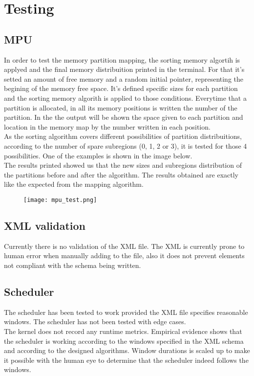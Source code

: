 \chapter{Testing}

\section{MPU}
In order to test the memory partition mapping, the sorting memory algortih is applyed and the final memory distribuition printed in the terminal. For 
that it's setted an amount of free memory and a random initial pointer, representing the begining of the memory free 
space. It's defined specific sizes for each partition and the sorting memory algorith is applied to those 
conditions. Everytime that a partition is allocated, in all its memory positions is written the number of 
the partition. In the the output will be shown the space given to each partition and location in the 
memory map by the number written in each position.\\
As the sorting algorithm covers different possibilities of partition distribuitions, according to the 
number of spare subregions (0, 1, 2 or 3), it is tested for those 4 possibilities. One of the examples is 
shown in the image below.\\
  The results printed showed us that the new sizes and subregions distribution of the partitions before and after the algorithm. The results obtained are exactly like the expected from the mapping algorithm.

\begin{figure}[H]
\centering
\texttt{[image: mpu\_test.png]}
\label{fig:testing_mpu}
\end{figure}


\section{XML validation}
Currently there is no validation of the XML file.
The XML is currently prone to human error when manually
adding to the file, also it does not prevent elements
not compliant with the schema being written.


\section{Scheduler}
The scheduler has been tested to work provided the XML file specifies reasonable
windows. The scheduler has not been tested with edge cases.\\
The kernel does not record any runtime metrics. Empirical
evidence shows that the scheduler is working according to the windows specified in the
XML schema and according to the designed algorithms. Window durations is
scaled up to make it possible with the human eye to determine that the scheduler
indeed follows the windows.



